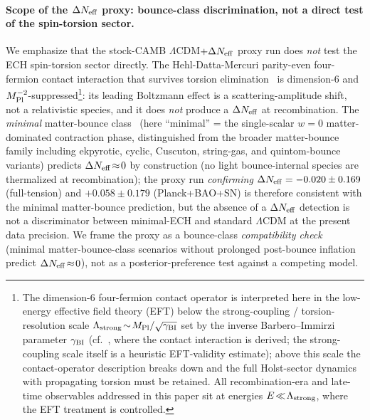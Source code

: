 \documentclass[aps,prd,twocolumn,superscriptaddress,showpacs,preprintnumbers,nofootinbib,longbibliography,floatfix]{revtex4-2}
\newcommand{\MPl}{M_{\rm Pl}}
\newcommand{\Neff}{N_{\rm eff}}
\newcommand{\cf}{cf.}
\begin{document}
\paragraph{Scope of the $\Delta\Neff$ proxy: bounce-class discrimination, not a direct test of the spin-torsion sector.}
We emphasize that the stock-CAMB $\Lambda$CDM$+\Delta\Neff$ proxy run does
\emph{not} test the ECH spin-torsion sector directly. The Hehl-Datta-Mercuri
parity-even four-fermion contact interaction that survives torsion
elimination~\cite{Hehl1976,Mercuri2006} is dimension-6 and $M_{\rm Pl}^{-2}$-suppressed\footnote{The
dimension-6 four-fermion contact operator is interpreted here in the
low-energy effective field theory (EFT) below the strong-coupling /
torsion-resolution scale $\Lambda_{\rm strong}\!\sim\!\MPl/\sqrt{\gamma_{\rm BI}}$
set by the inverse Barbero--Immirzi parameter $\gamma_{\rm BI}$
(\cf~\cite{Mercuri2006}, where the contact interaction is derived; the
strong-coupling scale itself is a heuristic EFT-validity estimate); above this scale the contact-operator description
breaks down and the full Holst-sector dynamics with propagating torsion
must be retained. All recombination-era and late-time observables addressed
in this paper sit at energies $E\!\ll\!\Lambda_{\rm strong}$, where the EFT
treatment is controlled.}:
its leading Boltzmann effect is a scattering-amplitude shift, not a
relativistic species, and it does \emph{not} produce a $\Delta\Neff$ at
recombination. The \emph{minimal} matter-bounce class~\cite{Cai:2009fn}
(here ``minimal'' = the single-scalar $w\!=\!0$ matter-dominated contraction
phase, distinguished from the broader matter-bounce family including
ekpyrotic, cyclic, Cuscuton, string-gas, and quintom-bounce variants)
predicts $\Delta\Neff\!\approx\!0$
by construction (no light bounce-internal species are thermalized at
recombination); the proxy run \emph{confirming} $\Delta\Neff = -0.020 \pm 0.169$
(full-tension) and $+0.058\pm 0.179$ (Planck+BAO+SN) is therefore consistent
with the minimal matter-bounce prediction, but the absence of a $\Delta\Neff$
detection is not a discriminator between minimal-ECH and standard
$\Lambda$CDM at the present data precision. We frame the proxy as a
bounce-class \emph{compatibility check} (minimal matter-bounce-class scenarios
without prolonged post-bounce inflation predict $\Delta\Neff\!\approx\!0$),
not as a posterior-preference test against a competing model.
\end{document}
